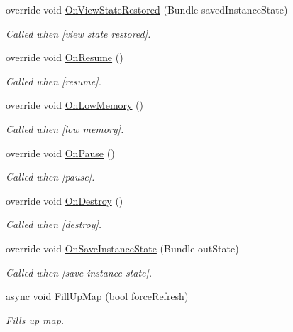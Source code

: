 \begin{DoxyCompactItemize}
override void \hyperlink{class_w_c_c_mobile_1_1_campus_map_fragment_a2e40c56cffe4afd446324f7e6c17dbf0}{On\+View\+State\+Restored} (Bundle saved\+Instance\+State)
\begin{DoxyCompactList}\small\item\em Called when \mbox{[}view state restored\mbox{]}. \end{DoxyCompactList}\item 
override void \hyperlink{class_w_c_c_mobile_1_1_campus_map_fragment_a276a913a3425ff6fea8e2a9e1a2dceab}{On\+Resume} ()
\begin{DoxyCompactList}\small\item\em Called when \mbox{[}resume\mbox{]}. \end{DoxyCompactList}\item 
override void \hyperlink{class_w_c_c_mobile_1_1_campus_map_fragment_ac9421f08586c486240677e620e1b77f8}{On\+Low\+Memory} ()
\begin{DoxyCompactList}\small\item\em Called when \mbox{[}low memory\mbox{]}. \end{DoxyCompactList}\item 
override void \hyperlink{class_w_c_c_mobile_1_1_campus_map_fragment_ab9a654ae03b0694e2f9364daefa38a73}{On\+Pause} ()
\begin{DoxyCompactList}\small\item\em Called when \mbox{[}pause\mbox{]}. \end{DoxyCompactList}\item 
override void \hyperlink{class_w_c_c_mobile_1_1_campus_map_fragment_ae36cb06e31b5df89265c090fc793a02f}{On\+Destroy} ()
\begin{DoxyCompactList}\small\item\em Called when \mbox{[}destroy\mbox{]}. \end{DoxyCompactList}\item 
override void \hyperlink{class_w_c_c_mobile_1_1_campus_map_fragment_aba8e302e20805918185e31239ad77553}{On\+Save\+Instance\+State} (Bundle out\+State)
\begin{DoxyCompactList}\small\item\em Called when \mbox{[}save instance state\mbox{]}. \end{DoxyCompactList}\item 
async void \hyperlink{class_w_c_c_mobile_1_1_campus_map_fragment_a4ebd3585687433851b85f97b7dd7d263}{Fill\+Up\+Map} (bool force\+Refresh)
\begin{DoxyCompactList}\small\item\em Fills up map. \end{DoxyCompactList}\item 

\end{DoxyCompactItemize}
